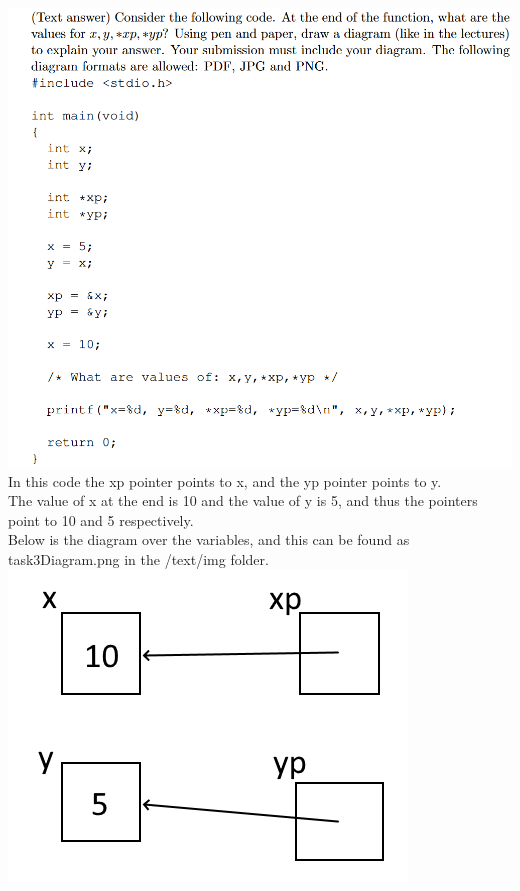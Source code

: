 \documentclass{article}
\begin{document}
\section{}
\includegraphics[width=\linewidth, keepaspectratio=true]{task3}
\vspace{2pt}\\
In this code the xp pointer points to x, and the yp pointer points to y.\\
The value of x at the end is 10 and the value of y is 5, and thus the pointers point to 10 and 5 respectively.\\
Below is the diagram over the variables, and this can be found as task3Diagram.png in the /text/img folder.\\
\includegraphics[scale=0.7, keepaspectratio=true]{task3Diagram}
\end{document}
